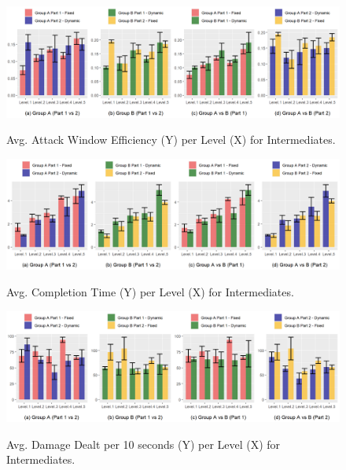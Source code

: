 \begin{figure}[!ht]
    \begin{center}
    \caption{Avg. Attack Window Efficiency (Y) per Level (X) for Intermediates.}
        \includegraphics[width=\textwidth]{figures/attack_window_efficiency-intermediate_players.png}
        \label{fig:result-metric-intermediates-attack-window-efficiency}
    \end{center}
\end{figure}

\begin{figure}[!ht]
    \begin{center}
    \caption{Avg. Completion Time (Y) per Level (X) for Intermediates.}
        \includegraphics[width=\textwidth]{figures/completion_time-intermediate_players.png}
        \label{fig:result-metric-intermediates-completion-time}
    \end{center}
\end{figure}

\begin{figure}[!ht]
    \begin{center}
    \caption{Avg. Damage Dealt per 10 seconds (Y) per Level (X) for Intermediates.}
        \includegraphics[width=\textwidth]{figures/damage_dealt_per_10s-intermediate_players.png}
        \label{fig:result-metric-intermediates-damage-dealt-per-10s}
    \end{center}
\end{figure}

